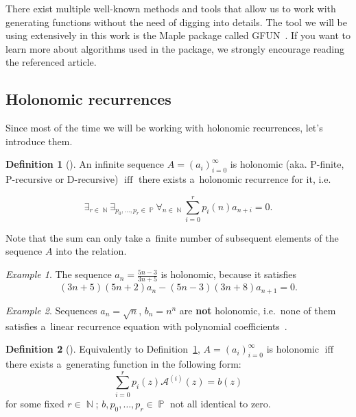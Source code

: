 \documentclass[final]{article}
\theoremstyle{definition}
\newtheorem{definition}{Definition}[subsection]
\theoremstyle{definition}
\theoremstyle{remark}
\newtheorem{example}{Example}[subsection]
\newcommand{\gf}[1]{\ensuremath{\mathcal{#1}}}
\DeclareMathOperator{\textiff}{\text{iff}}
\DeclareMathOperator{\N}{\mathbb{N}}
\DeclareMathOperator{\poly}{\mathbb{P}}
\begin{document}
There exist multiple well-known methods and tools that allow us to work with generating functions without the need of digging into details. The tool we will be using extensively in this work is the Maple package called GFUN~\cite{gfun}. If you want to learn more about algorithms used in the package, we strongly encourage reading the referenced article.

\subsection{Holonomic recurrences}%
\label{sub:holonomic_recurrences}

Since most of the time we will be working with holonomic recurrences, let's introduce them.

\begin{definition}[\cite{holotoolkit}]%
    \label{def:holo_1}
    An infinite sequence \(A = {(a_i)}_{i=0}^{\infty}\) is holonomic (aka. P-finite, P-recursive or D-recursive) \(\textiff\) there exists a~holonomic recurrence for it, i.e.

\[\exists_{r \in \N} \exists_{p_0, \ldots, p_r \in \poly} \forall_{n \in \N} \sum_{i=0}^r p_i(n)a_{n+i} = 0.\]
\end{definition}

Note that the sum can only take a~finite number of subsequent elements of the sequence \(A\) into the relation.

\begin{example}
    The sequence \(a_n = \frac{5n - 3}{3n + 5}\) is holonomic, because it satisfies
    \[(3n + 5)(5n + 2) a_n - (5n - 3)(3n + 8) a_{n+1} = 0.\]
\end{example}

\begin{example}
    Sequences \(a_n = \sqrt{n}\), \(b_n = n^n\) are \textbf{not} holonomic, i.e.~none of them satisfies a~linear recurrence equation with polynomial coefficients~\cite{nonholo}.
\end{example}

\begin{definition}[\cite{complexity}]%
    \label{def:holo_2}
    Equivalently to Definition~\ref{def:holo_1}, \(A = {(a_i)}_{i=0}^{\infty}\) is holonomic \(\textiff\) there exists a~generating function in the following form:
    \[\sum_{i=0}^{r} p_i(z) \gf{A}^{(i)}(z) = b(z)\]
    for some fixed \(r \in \N\); \(b, p_0, \ldots, p_r \in \poly\) not all identical to zero.
\end{definition}
\end{document}
